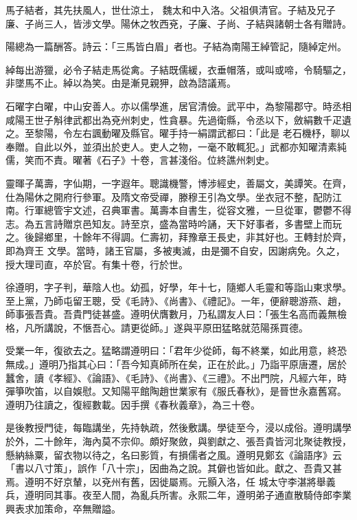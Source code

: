 \begin{pinyinscope}
 馬子結者，其先扶風人，世仕涼土，
 魏太和中入洛。父祖俱清官。子結及兄子廉、子尚三人，皆涉文學。陽休之牧西兗，子廉、子尚、子結與諸朝士各有贈詩。



 陽總為一篇酬答。詩云：「三馬皆白眉」者也。子結為南陽王綽管記，隨綽定州。



 綽每出游獵，必令子結走馬從禽。子結既儒緩，衣垂帽落，或叫或啼，令騎驅之，非墜馬不止。綽以為笑。由是漸見親狎，啟為諮議焉。



 石曜字白曜，中山安善人。亦以儒學進，居官清儉。武平中，為黎陽郡守。時丞相咸陽王世子斛律武都出為兗州刺史，性貪暴。先過衛縣，令丞以下，斂絹數千疋遺之。至黎陽，令左右諷動曜及縣官。曜手持一絹謂武都曰：「此是
 老石機杼，聊以奉贈。自此以外，並須出於吏人。吏人之物，一毫不敢輒犯。」武都亦知曜清素純儒，笑而不責。曜著《石子》十卷，言甚淺俗。位終譙州刺史。



 靈暉子萬壽，字仙期，一字遐年。聰識機警，博涉經史，善屬文，美譚笑。在齊，仕為陽休之開府行參軍。及隋文帝受禪，滕穆王引為文學。坐衣冠不整，配防江南。行軍總管宇文述，召典軍書。萬壽本自書生，從容文雅，一旦從軍，鬱鬱不得志。為五言詩贈京邑知友。詩至京，盛為當時吟誦，天下好事者，多書壁上而玩之。後歸鄉里，十餘年不得調。仁壽初，拜豫章王長史，非其好也。王轉封於齊，即為齊王
 文學。當時，諸王官屬，多被夷滅，由是彌不自安，因謝病免。久之，授大理司直，卒於官。有集十卷，行於世。



 徐遵明，字子判，華陰人也。幼孤，好學，年十七，隨鄉人毛靈和等詣山東求學。至上黨，乃師屯留王聰，受《毛詩》、《尚書》、《禮記》。一年，便辭聰游燕、趙，師事張吾貴。吾貴門徒甚盛。遵明伏膺數月，乃私謂友人曰：「張生名高而義無檢格，凡所講說，不愜吾心。請更從師。」遂與平原田猛略就范陽孫買德。



 受業一年，復欲去之。猛略謂遵明曰：「君年少從師，每不終業，如此用意，終恐無成。」遵明乃指其心曰：「吾今知真師所在矣，正在於此。」乃詣平原唐遷，居於
 蠶舍，讀《孝經》、《論語》、《毛詩》、《尚書》、《三禮》。不出門院，凡經六年，時彈箏吹笛，以自娛慰。又知陽平館陶趙世業家有《服氏春秋》，是晉世永嘉舊寫。遵明乃往讀之，復經數載。因手撰《春秋義章》，為三十卷。



 是後教授門徒，每臨講坐，先持執疏，然後敷講。學徒至今，浸以成俗。遵明講學於外，二十餘年，海內莫不宗仰。頗好聚斂，與劉獻之、張吾貴皆河北聚徒教授，懸納絲粟，留衣物以待之，名曰影質，有損儒者之風。遵明見鄭玄《論語序》云「書以八寸策」，誤作「八十宗」，因曲為之說。其僻也皆如此。獻之、吾貴又甚焉。遵明不好京輦，以兗州有舊，因徙屬焉。元顥入洛，任
 城太守李湛將舉義兵，遵明同其事。夜至人間，為亂兵所害。永熙二年，遵明弟子通直散騎侍郎李業興表求加策命，卒無贈謚。




\end{pinyinscope}
